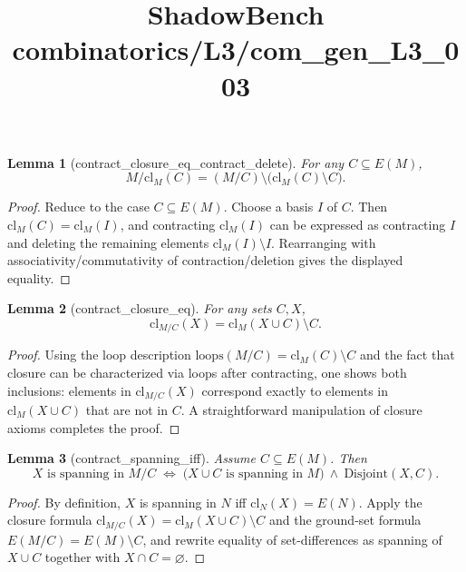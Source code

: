 \documentclass{article}
\title{ShadowBench combinatorics/L3/com\_gen\_L3\_003}
\newtheorem{lemma}{Lemma}
\begin{document}
\maketitle

\begin{lemma}[contract_closure_eq_contract_delete]
For any \(C\subseteq E(M)\),
\[
M/\mathrm{cl}_M(C)= (M/C)\setminus\bigl(\mathrm{cl}_M(C)\setminus C\bigr).
\]
\end{lemma}
\begin{proof}
Reduce to the case \(C\subseteq E(M)\). Choose a basis \(I\) of \(C\).
Then \(\mathrm{cl}_M(C)=\mathrm{cl}_M(I)\), and contracting \(\mathrm{cl}_M(I)\) can be expressed as
contracting \(I\) and deleting the remaining elements \(\mathrm{cl}_M(I)\setminus I\).
Rearranging with associativity/commutativity of contraction/deletion gives the displayed equality.
\end{proof}

\begin{lemma}[contract_closure_eq]
For any sets \(C,X\),
\[
\mathrm{cl}_{M/C}(X)=\mathrm{cl}_M(X\cup C)\setminus C.
\]
\end{lemma}
\begin{proof}
Using the loop description \(\mathrm{loops}(M/C)=\mathrm{cl}_M(C)\setminus C\) and the fact that
closure can be characterized via loops after contracting, one shows both inclusions:
elements in \(\mathrm{cl}_{M/C}(X)\) correspond exactly to elements in \(\mathrm{cl}_M(X\cup C)\)
that are not in \(C\). A straightforward manipulation of closure axioms completes the proof.
\end{proof}

\begin{lemma}[contract_spanning_iff]
Assume \(C\subseteq E(M)\). Then
\[
X \text{ is spanning in } M/C
\;\Longleftrightarrow\;
\bigl(X\cup C \text{ is spanning in } M\bigr)\ \wedge\ \mathrm{Disjoint}(X,C).
\]
\end{lemma}
\begin{proof}
By definition, \(X\) is spanning in \(N\) iff \(\mathrm{cl}_N(X)=E(N)\).
Apply the closure formula \(\mathrm{cl}_{M/C}(X)=\mathrm{cl}_M(X\cup C)\setminus C\) and the ground-set
formula \(E(M/C)=E(M)\setminus C\), and rewrite equality of set-differences as spanning of \(X\cup C\)
together with \(X\cap C=\varnothing\).
\end{proof}
\end{document}
